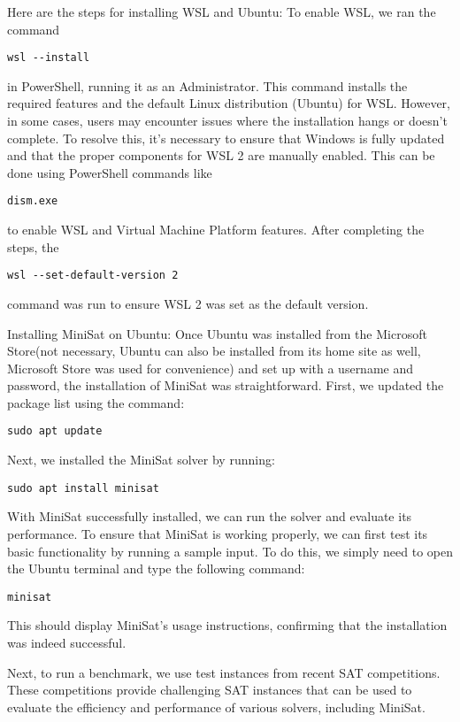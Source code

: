 \documentclass[runningheads]{llncs}
\begin{document}
Here are the steps for installing \ac{WSL} and Ubuntu: To enable \ac{WSL}, we ran the command \begin{verbatim}wsl --install\end{verbatim} in PowerShell, running it as an Administrator. This command installs the required features and the default Linux distribution (Ubuntu) for \ac{WSL}. However, in some cases, users may encounter issues where the installation hangs or doesn't complete. To resolve this, it's necessary to ensure that Windows is fully updated and that the proper components for \ac{WSL} 2 are manually enabled. This can be done using PowerShell commands like \begin{verbatim}dism.exe\end{verbatim} to enable \ac{WSL} and Virtual Machine Platform features. After completing the steps, the \begin{verbatim}wsl --set-default-version 2 \end{verbatim}  command was run to ensure \ac{WSL} 2 was set as the default version.

Installing MiniSat on Ubuntu: Once Ubuntu was installed from the Microsoft Store(not necessary, Ubuntu can also be installed from its home site as well, Microsoft Store was used for convenience) and set up with a username and password, the installation of MiniSat was straightforward. First, we updated the package list using the command: \begin{verbatim}sudo apt update\end{verbatim} Next, we installed the MiniSat solver by running: \begin{verbatim}sudo apt install minisat\end{verbatim}

With MiniSat successfully installed, we can run the solver and evaluate its performance. To ensure that MiniSat is working properly, we can first test its basic functionality by running a sample input. To do this, we simply need to open the Ubuntu terminal and type the following command: \begin{verbatim}minisat\end{verbatim} This should display MiniSat’s usage instructions, confirming that the installation was indeed successful.

Next, to run a benchmark, we use test instances from recent SAT competitions. These competitions provide challenging SAT instances that can be used to evaluate the efficiency and performance of various solvers, including MiniSat.
\end{document}
